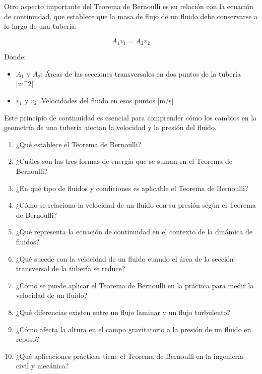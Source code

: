 \documentclass[../main]{subfiles}
\begin{document}
{Otro aspecto importante del Teorema de Bernoulli es su relación con la ecuación de continuidad, que establece que la masa de flujo de un fluido debe conservarse a lo largo de una tubería:

\begin{equation}
A_1 v_1 = A_2 v_2
\end{equation}

Donde:
\begin{itemize}
    \item $A_1$ y $A_2$: Áreas de las secciones transversales en dos puntos de la tubería [m^2]
    \item $v_1$ y $v_2$: Velocidades del fluido en esos puntos [m/s]
\end{itemize}

Este principio de continuidad es esencial para comprender cómo los cambios en la geometría de una tubería afectan la velocidad y la presión del fluido.

}

\begin{enumerate}
\item ¿Qué establece el Teorema de Bernoulli?
\item ¿Cuáles son las tres formas de energía que se suman en el Teorema de Bernoulli?
\item ¿En qué tipo de fluidos y condiciones es aplicable el Teorema de Bernoulli?
\item ¿Cómo se relaciona la velocidad de un fluido con su presión según el Teorema de Bernoulli?
\item ¿Qué representa la ecuación de continuidad en el contexto de la dinámica de fluidos?
\item ¿Qué sucede con la velocidad de un fluido cuando el área de la sección transversal de la tubería se reduce?
\item ¿Cómo se puede aplicar el Teorema de Bernoulli en la práctica para medir la velocidad de un fluido?
\item ¿Qué diferencias existen entre un flujo laminar y un flujo turbulento?
\item ¿Cómo afecta la altura en el campo gravitatorio a la presión de un fluido en reposo?
\item ¿Qué aplicaciones prácticas tiene el Teorema de Bernoulli en la ingeniería civil y mecánica?

\end{enumerate}
\end{document}
